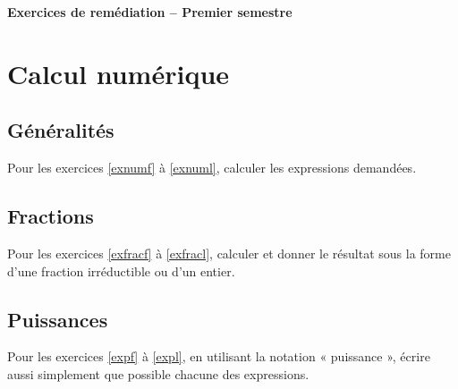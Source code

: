 \documentclass[a4paper,12pt]{article}
\begin{document}
\setlength{\cftbeforesecskip}{2pt}

\setlength{\cftsecindent}{1em}
\begin{center}
{\bfseries \Huge Exercices de remédiation -- Premier semestre}
\vspace{1cm}


\end{center}\vspace{-1cm}
\tableofcontents
\newpage

\section{Calcul numérique}
\subsection{Généralités}
Pour les exercices \ref{exnumf} à \ref{exnuml}, calculer les expressions demandées. 

\subsection{Fractions}
Pour les exercices \ref{exfracf} à \ref{exfracl}, calculer et donner le résultat sous la forme d'une fraction irréductible ou d'un entier.




\subsection{Puissances}
Pour les exercices \ref{expf} à \ref{expl}, en utilisant la notation « puissance », écrire aussi simplement que possible chacune des expressions.
\end{document}
